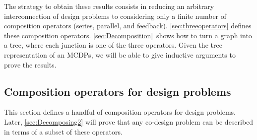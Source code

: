 The strategy to obtain these results consists in reducing an arbitrary
interconnection of design problems to considering\emph{ }only a finite
number of composition operators (series, parallel, and feedback).
\cref{sec:threeoperators} defines these composition operators. \cref{sec:Decomposition}~shows
how to turn a graph into a tree, where each junction is one of the
three operators. Given the tree representation of an MCDPs, we will
be able to give inductive arguments to prove the results.



\subsection{Composition operators for design problems}

This section defines a handful of composition operators for design
problems. Later, \cref{sec:Decomposing2} will prove that any co-design
problem can be described in terms of a subset of these operators.

